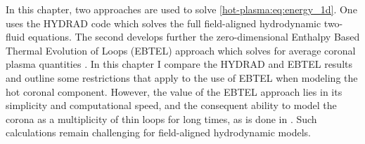 In this chapter, two approaches are used to solve \autoref{hot-plasma:eq:energy_1d}. One uses the HYDRAD code \citep[see \autoref{sec:hydrad}]{bradshaw_influence_2013} which solves the full field-aligned hydrodynamic two-fluid equations. The second develops further the zero-dimensional Enthalpy Based Thermal Evolution of Loops (EBTEL) approach which solves for average coronal plasma quantities \citep{klimchuk_highly_2008,cargill_enthalpy-based_2012,cargill_enthalpy-based_2012-1,cargill_modelling_2015}. In this chapter I compare the HYDRAD and EBTEL results and outline some restrictions that apply to the use of EBTEL when modeling the hot coronal component. However, the value of the EBTEL approach lies in its simplicity and computational speed, and the consequent ability to model the corona as a multiplicity of thin loops for long times, as is done in . Such calculations remain challenging for field-aligned hydrodynamic models.

